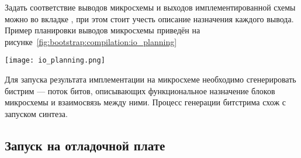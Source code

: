 Задать соответствие выводов микросхемы и выходов имплементированной схемы можно во вкладке ,
при этом стоит учесть описание назначения каждого вывода. Пример планировки выводов микросхемы
приведён на рисунке~\ref{fig:bootstrap:compilation:io_planning}

\begin{center}
  \centering
  \texttt{[image: io\_planning.png]}
  \label{fig:bootstrap:compilation:io_planning}
\end{center}

Для запуска результата имплементации на микросхеме необходимо сгенерировать бистрим ---
поток битов, описывающих функциональное назначение блоков микросхемы и взаимосвязь
между ними. Процесс генерации битстрима схож с запуском синтеза.

\subsection{Запуск на отладочной плате}
\label{sec:bootstrap:board}